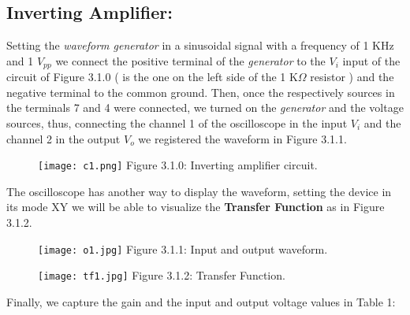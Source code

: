 \subsection{Inverting Amplifier:}

Setting the {\itshape waveform generator} in a sinusoidal signal with a frequency of 1 KHz and 1 $V_{pp}$ we connect the positive terminal of the {\itshape generator} to the $V_{i}$ input of the circuit of Figure 3.1.0 ( is the one on the left side of the 1 K$\Omega$ resistor ) and the negative terminal to the common ground. Then, once the respectively sources in the terminals 7 and 4 were connected, we turned on the {\itshape generator} and the voltage sources, thus, connecting the channel 1 of the oscilloscope in the input $V_{i}$ and the channel 2 in the output $V_{o}$ we registered the waveform in Figure 3.1.1. \hfill \break

\begin{figure}[H]
\texttt{[image: c1.png]}
\centering \linebreak \linebreak Figure 3.1.0: Inverting amplifier circuit.
\end{figure} \hfill

The oscilloscope has another way to display the waveform, setting the device in its mode XY we will be able to visualize the {\bfseries Transfer Function} as in Figure 3.1.2. \hfill \break

\begin{multicols}{2}
\begin{figure}[H]
\texttt{[image: o1.jpg]}
\centering \linebreak \linebreak Figure 3.1.1: Input and output waveform.
\end{figure}

\begin{figure}[H]
\texttt{[image: tf1.jpg]}
\centering \linebreak \linebreak Figure 3.1.2: Transfer Function.
\end{figure}
\end{multicols} \hfill

{\bfseries\itshape\color{carmine}{Observation:}} {\itshape\color{carmine}{The yellow waveform corresponds to the channel 1 and the blue waveform to channel 2 for Figure 3.1.1.}} \hfill \break

Finally, we capture the gain and the input and output voltage values in Table 1: \hfill \break

